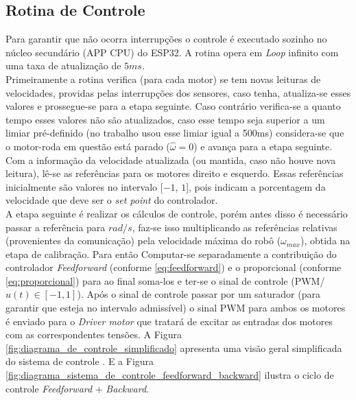 \subsection{Rotina de Controle}
\label{subsec:rotina_controle}
Para garantir que não ocorra interrupções o controle é executado sozinho no núcleo secundário (APP CPU) do ESP32. A rotina opera em \emph{Loop} infinito com uma taxa de atualização de $5ms$.\\

Primeiramente a rotina verifica (para cada motor) se tem novas leituras de velocidades, providas pelas interrupções dos sensores, caso tenha, atualiza-se esses valores e prossegue-se para a etapa seguinte. Caso contrário verifica-se a quanto tempo esses valores não são atualizados, caso esse tempo seja superior a um limiar pré-definido (no trabalho usou esse limiar igual a 500ms) considera-se que o motor-roda em questão está parado ($\hat{\omega} = 0$) e avança para a etapa seguinte.\\

Com a informação da velocidade atualizada (ou mantida, caso não houve nova leitura), lê-se as referências para os motores direito e esquerdo. Essas referências inicialmente são valores no intervalo [$-1$, $1$], pois indicam a porcentagem da velocidade que deve ser o \emph{set point} do controlador. \\

A etapa seguinte é realizar os cálculos de controle, porém antes disso é necessário passar a referência para $rad/s$, faz-se isso multiplicando as referências relativas (provenientes da comunicação) pela velocidade máxima do robô ($\omega_{max}$), obtida na etapa de calibração. Para então Computar-se separadamente a contribuição do controlador \emph{Feedforward} (conforme \ref{eq:feedforward}) e o proporcional (conforme \ref{eq:proporcional}) para ao final soma-los e ter-se o sinal de controle (PWM/$u(t) \in [-1,1]$). Após o sinal de controle passar por um saturador (para garantir que esteja no intervalo admissível) o sinal PWM para ambos os motores é enviado para o \emph{Driver motor} que tratará de excitar as entradas dos motores com as correspondentes tensões. A Figura \ref{fig:diagrama_de_controle_simplificado} apresenta uma visão geral simplificada do sistema de controle . E a Figura \ref{fig:diagrama_sistema_de_controle_feedforward_backward} ilustra o ciclo de controle \emph{Feedforward} + \emph{Backward}.

